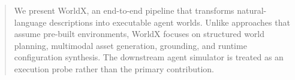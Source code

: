 \begin{abstract}
We present WorldX, an end-to-end pipeline that transforms natural-language descriptions into executable agent worlds. Unlike approaches that assume pre-built environments, WorldX focuses on structured world planning, multimodal asset generation, grounding, and runtime configuration synthesis. The downstream agent simulator is treated as an execution probe rather than the primary contribution.
\end{abstract}
